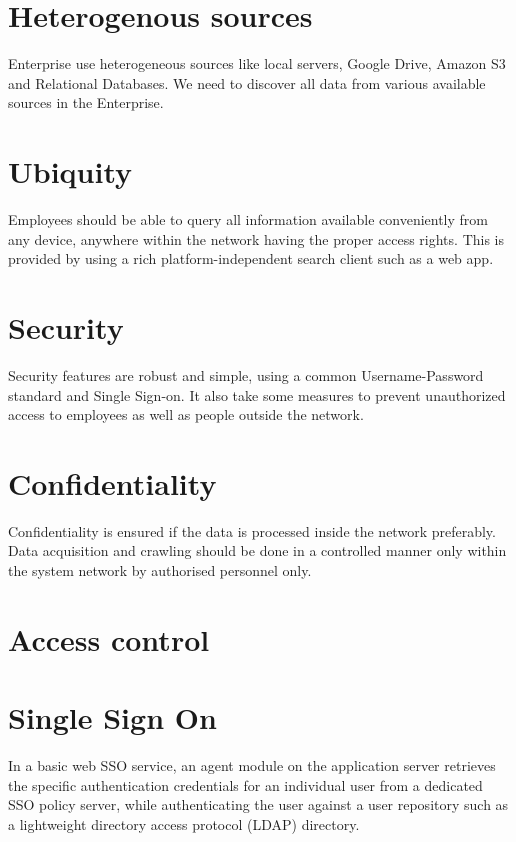 \documentclass[a4paper,12pt,oneside]{book}
\begin{document}
\section{Heterogenous sources}
Enterprise use heterogeneous sources like local servers, Google Drive, Amazon S3 and Relational Databases. We need to discover all data from various available sources in the Enterprise.

\section{Ubiquity}
Employees should be able to query all information available conveniently from any device, anywhere within the network having the proper access rights. This is provided by using a rich platform-independent search client such as a web app.

\section{Security}
Security features are robust and simple, using a common Username-Password standard and Single Sign-on. It also take some measures to prevent unauthorized access to employees as well as people outside the network.

\section{Confidentiality}
Confidentiality is ensured if the data is processed inside the network preferably. Data acquisition and crawling should be done in a controlled manner only within the system network by authorised personnel only.

\section{Access control}
\lipsum

\section{Single Sign On}
\lipsum

In a basic web SSO service, an agent module on the application server retrieves the specific authentication credentials for an individual user from a dedicated SSO policy server, while authenticating the user against a user repository such as a lightweight directory access protocol (LDAP) directory.
\end{document}
